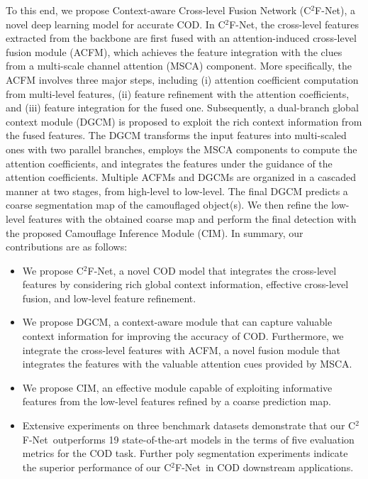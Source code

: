 \documentclass[lettersize,journal]{IEEEtran}
\newcommand{\ourM}{{C$^2$F-Net}}
\begin{document}
To this end, we propose Context-aware Cross-level Fusion Network (\ourM), a novel deep learning model for accurate COD.
In \ourM, the cross-level features extracted from the backbone are first fused with an attention-induced cross-level fusion module (ACFM), which achieves the feature integration with the clues from a multi-scale channel attention (MSCA) component.
More specifically, the ACFM involves three major steps, including (i) attention coefficient computation from multi-level features, (ii) feature refinement with the attention coefficients, and (iii) feature integration for the fused one.
Subsequently, a dual-branch global context module (DGCM) is proposed to exploit the rich context information from the fused features.
The DGCM transforms the input features into multi-scaled ones with two parallel branches, employs the MSCA components to compute the attention coefficients, and integrates the features under the guidance of the attention coefficients.
Multiple ACFMs and DGCMs are organized in a cascaded manner at two stages, from high-level to low-level.
The final DGCM predicts a coarse segmentation map of the camouflaged object(s).
We then refine the low-level features with the obtained coarse map and perform the final detection with the proposed Camouflage Inference Module (CIM).
In summary, our contributions are as follows:
\begin{itemize}
	\item We propose \ourM, a novel COD model that integrates the cross-level features by considering rich global context information, effective cross-level fusion, and low-level feature refinement.
	\item We propose DGCM, a context-aware module that can capture valuable context information for improving the accuracy of COD. Furthermore, we integrate the cross-level features with ACFM, a novel fusion module that integrates the features with the valuable attention cues provided by MSCA.
	\item We propose CIM, an effective module capable of exploiting informative features from the low-level features refined by a coarse prediction map.
	\item Extensive experiments on three benchmark datasets demonstrate that our \ourM~outperforms 19 state-of-the-art models in the terms of five evaluation metrics for the COD task.
	Further poly segmentation experiments indicate the superior performance of our \ourM~in COD downstream applications.
\end{itemize}
\end{document}
